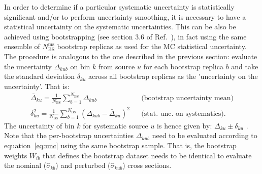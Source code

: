 In order to determine if a particular systematic uncertainty is statistically significant and/or to perform uncertainty smoothing, it is necessary to have a statistical uncertainty on the systematic uncertainties. This can be also be achieved using bootstrapping (see section 3.6 of Ref.~\cite{ATLAS-bootstrap}), in fact using the same ensemble of $N_\mathrm{BS}^\mathrm{ms}$ bootstrap replicas as used for the MC statistical uncertainty. The procedure is analogous to the one described in the previous section: evaluate the uncertainty $\Delta_{kub}$ on bin $k$ from source $u$ for each bootstrap replica $b$ and take the standard deviation $\delta_{ku}$ across all bootstrap replicas as the 'uncertainty on the uncertainty'. That is:
\begin{eqnarray}
  \label{eq:unc-on-unc}
  \bar{\Delta}_{ku} = \frac{1}{N_\mathrm{BS}}\sum_{b=1}^{N_\mathrm{BS}} \Delta_{kub}
  & & \text{(bootstrap uncertainty mean)}\\
  \delta_{ku}^2 = \frac{1}{N_\mathrm{BS}}\sum_{b=1}^{N_\mathrm{BS}} \left(\Delta_{kub} - \bar{\Delta}_{ku}\right)^2
  & & \text{(stat.~unc.~on systematics)}.
\end{eqnarray}
The uncertainty of bin $k$ for systematic source $u$ is hence given by: $\Delta_{ku} \pm \delta_{ku}$ .
Note that the per-bootstrap uncertainties $\Delta_{kub}$ need to be evaluated according to equation~\ref{eq:unc} using the same bootstrap sample.
That is, the bootstrap weights $W_{ib}$ that defines the bootstrap dataset needs to be identical to evaluate the nominal
($\hat{\sigma}_{kb}$) and perturbed ($\hat{\sigma}_{kub}$) cross sections.

